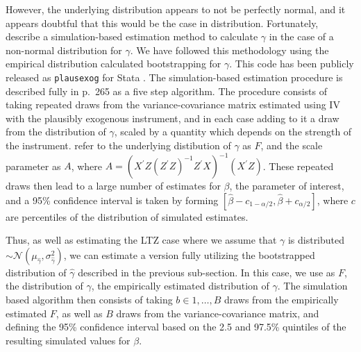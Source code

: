 \documentclass[a4paper, 11pt]{article}
\theoremstyle{plain}
\begin{document}
However, the underlying distribution appears to not be perfectly normal,
and it appears doubtful that this would be the case in distribution.
Fortunately, \citet{Conleyetal2012} describe a simulation-based estimation
method to calculate $\gamma$ in the case of a non-normal distribution for
$\gamma$.  We have followed this methodology using the empirical distribution
calculated bootstrapping for $\gamma$.  This code has been publicly released
as \texttt{plausexog} for Stata \citep{Clarke2014}.  The simulation-based
estimation procedure is described fully in \citet{Conleyetal2012} p.\ 265
as a five step algorithm.  The procedure consists of taking repeated draws
from the variance-covariance matrix estimated using IV with the plausibly
exogenous instrument, and in each case adding to it a draw from the
distribution of $\gamma$, scaled by a quantity which depends
on the strength of the instrument. \citeauthor{Conleyetal2012} refer to the
underlying distibution of $\gamma$ as $F$, and the scale parameter as $A$,
where $A=(X^\prime Z(Z^\prime Z)^{-1}Z^\prime X)^{-1}(X^\prime Z)$.
These repeated draws then lead to a large number of estimates for $\beta$,
the parameter of interest, and a 95\% confidence interval is taken by
forming $[\hat\beta-c_{1-\alpha/2},\hat\beta+c_{\alpha/2}]$, where $c$ are
percentiles of the distribution of simulated estimates.

Thus, as well as estimating the LTZ case where we assume that $\gamma$
is distributed $\sim \mathcal{N}(\mu_{\hat\gamma},\sigma^2_{\hat\gamma})$,
we can estimate a version fully utilizing the bootstrapped distribution
of $\hat\gamma$ described in the previous sub-section.  In this case, we
use as $F$, the distribution of $\gamma$, the empirically estimated
distribution of $\gamma$.  The simulation based algorithm then consists
of taking $b\in 1,\ldots,B$ draws from the empirically estimated $F$, as
well as $B$ draws from the variance-covariance matrix, and defining the
95\% confidence interval based on the 2.5 and 97.5\% quintiles of the
resulting simulated values for $\beta$.



\newpage

\end{document}
